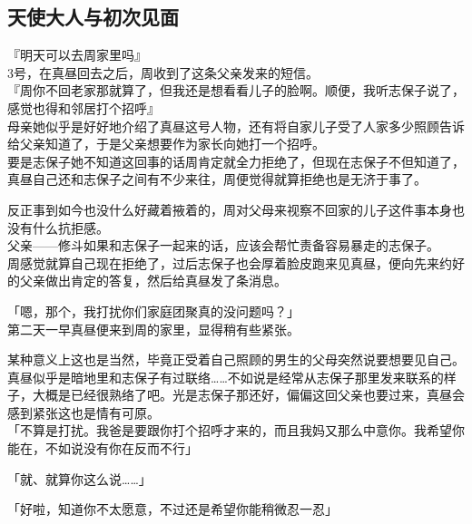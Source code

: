 \subsection{天使大人与初次见面}

『明天可以去周家里吗』\\

3号，在真昼回去之后，周收到了这条父亲发来的短信。\\

『周你不回老家那就算了，但我还是想看看儿子的脸啊。顺便，我听志保子说了，感觉也得和邻居打个招呼』\\

母亲她似乎是好好地介绍了真昼这号人物，还有将自家儿子受了人家多少照顾告诉给父亲知道了，于是父亲想要作为家长向她打一个招呼。\\

要是志保子她不知道这回事的话周肯定就全力拒绝了，但现在志保子不但知道了，真昼自己还和志保子之间有不少来往，周便觉得就算拒绝也是无济于事了。

反正事到如今也没什么好藏着掖着的，周对父母来视察不回家的儿子这件事本身也没有什么抗拒感。\\

父亲——修斗如果和志保子一起来的话，应该会帮忙责备容易暴走的志保子。\\

周感觉就算自己现在拒绝了，过后志保子也会厚着脸皮跑来见真昼，便向先来约好的父亲做出肯定的答复，然后给真昼发了条消息。\\

\vspace{2\baselineskip}

「嗯，那个，我打扰你们家庭团聚真的没问题吗？」\\

第二天一早真昼便来到周的家里，显得稍有些紧张。

某种意义上这也是当然，毕竟正受着自己照顾的男生的父母突然说要想要见自己。\\

真昼似乎是暗地里和志保子有过联络……不如说是经常从志保子那里发来联系的样子，大概是已经很熟络了吧。光是志保子那还好，偏偏这回父亲也要过来，真昼会感到紧张这也是情有可原。\\

「不算是打扰。我爸是要跟你打个招呼才来的，而且我妈又那么中意你。我希望你能在，不如说没有你在反而不行」

「就、就算你这么说……」

「好啦，知道你不太愿意，不过还是希望你能稍微忍一忍」\\

